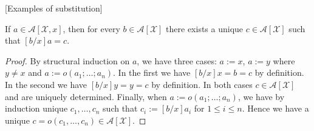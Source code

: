 [Examples of substitution]

\begin{theorem}
    If $a \in \mathcal{A}[\mathcal{X},x]$, then for every $b \in \mathcal{A}[\mathcal{X}]$ there exists a unique $c \in \mathcal{A}[\mathcal{X}]$ such that $[b/x]a = c$.
\end{theorem}
\begin{proof}
    By structural induction on $a$, we have three cases: $a := x$, $a:=y$ where $y \ne x$ and $a := o(a_1; \dots; a_n)$. In the first we have $[b/x]x=b=c$ by definition. In the second we have $[b/x]y=y=c$ by definition. In both cases $c \in \mathcal{A}[\mathcal{X}]$ and are uniquely determined. Finally, when $a := o(a_1; \dots; a_n)$, we have by induction unique $c_1,\dots, c_n$ such that $c_i:=[b/x]a_i$ for $1 \le i \le n$. Hence we have a unique $c=o(c_1,\dots,c_n) \in \mathcal{A}[\mathcal{X}]$.

\end{proof}








